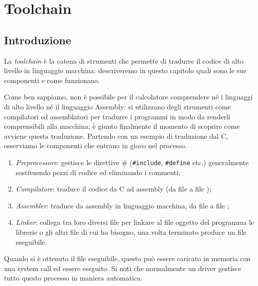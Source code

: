 




\chapter{Toolchain}\label{ch:tool}

\section{Introduzione}
La \emph{toolchain} è la catena di strumenti che permette di tradurre il codice di alto livello in linguaggio macchina: descriveremo in questo capitolo quali sono le sue componenti e come funzionano.

Come ben sappiamo, non è possibile per il calcolatore comprendere né i linguaggi di alto livello né il linguaggio Assembly: si utilizzano degli strumenti come compilatori ed assemblatori per tradurre i programmi in modo da renderli comprensibili alla macchina; è giunto finalmente il momento di scoprire come avviene questa traduzione. Partendo con un esempio di traduzione dal C, osserviamo le componenti che entrano in gioco nel processo.
\begin{enumerate}
	\item \emph{Preprocessore}: gestisce le direttive \# (\texttt{#include}, \texttt{#define} etc.) generalmente sostituendo pezzi di codice ed eliminando i commenti;
	\item \emph{Compilatore}: traduce il codice da C ad assembly (da file  a file );
	\item \emph{Assembler}: traduce da assembly in linguaggio macchina, da file  a file ;
	\item \emph{Linker}: collega tra loro diversi file  per linkare al file oggetto del programma le librerie o gli altri file  di cui ha bisogno, una volta terminato produce un file eseguibile.
\end{enumerate}
Quando si è ottenuto il file eseguibile, questo può essere caricato in memoria con una system call ed essere eseguito. Si noti che normalmente un driver gestisce tutto questo processo in maniera automatica.

